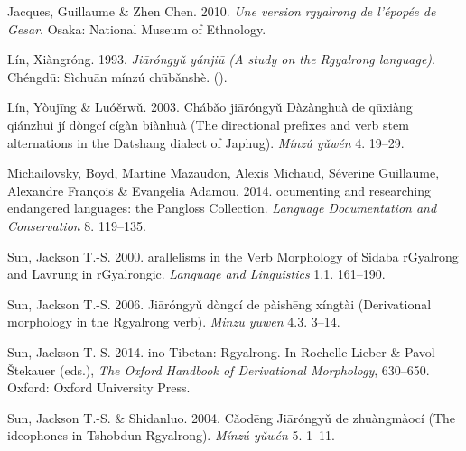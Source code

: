 \begin{thebibliography}{17}
Jacques, Guillaume \& Zhen Chen. 2010.
\newblock \emph{{U}ne version rgyalrong de l'épopée de {G}esar}.
\newblock Osaka: National Museum of Ethnology.

Lín, Xiàngróng. 1993.
\newblock \emph{ {J}iāróngy\v{u} yánjiū ({A} study on
  the {R}gyalrong language)}.
\newblock {} Chéngdū: Sìchuān mínzú
  chūb\v{a}nshè.
\newblock ().

Lín, Yòujīng \& Luó\v{e}rw\v{u}. 2003.
\newblock {}
  {C}hábǎo jiāróngyǔ {D}àzànghuà de qūxiàng qiánzhuì
  jí dòngcí cígàn biànhuà ({T}he directional prefixes and verb
  stem alternations in the {D}atshang dialect of {J}aphug).
\newblock \emph{ Mínzú y\v{u}wén} 4. 19--29.

Michailovsky, Boyd, Martine Mazaudon, Alexis Michaud, Séverine Guillaume,
  Alexandre François \& Evangelia Adamou. 2014.
ocumenting and researching endangered languages: the {P}angloss
  {C}ollection.
\newblock \emph{Language Documentation and Conservation} 8. 119–135.

Sun, Jackson T.-S. 2000.
arallelisms in the {V}erb {M}orphology of {S}idaba r{G}yalrong and
  {L}avrung in r{G}yalrongic.
\newblock \emph{Language and Linguistics} 1.1. 161--190.

Sun, Jackson T.-S. 2006.
\newblock {} {J}iāróngyǔ dòngcí de
  pàishēng xíngtài ({D}erivational morphology in the {R}gyalrong verb).
\newblock \emph{Minzu yuwen } 4.3. 3--14.

Sun, Jackson T.-S. 2014.
ino-{T}ibetan: {R}gyalrong.
\newblock In Rochelle Lieber \& Pavol Štekauer (eds.), \emph{{T}he {O}xford
  {H}andbook of {D}erivational {M}orphology}, 630--650. Oxford: Oxford
  University Press.

Sun, Jackson T.-S. \& Shidanluo. 2004.
\newblock {} {C}ǎodēng {J}iāróngyǔ de
  zhuàngmàocí ({T}he ideophones in {T}shobdun {R}gyalrong).
\newblock \emph{Mínzú y\v{u}wén } 5. 1--11.

\end{thebibliography}

\cleardoublepage
{}
\setmainfont[Mapping=tex-text,Numbers=OldStyle,Ligatures=Common]{Charis SIL} 